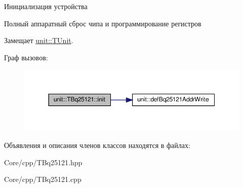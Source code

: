Инициализация устройства 



 Полный аппаратный сброс чипа и программирование регистров 

Замещает \hyperlink{classunit_1_1_t_unit_afc001dd57ba88e571e6b650a416b76a5}{unit\+::\+T\+Unit}.

Граф вызовов\+:\nopagebreak
\begin{figure}[H]
\begin{center}
\leavevmode
\includegraphics[width=350pt]{classunit_1_1_t_bq25121_a195490b2493631c50f5f7380436c24be_cgraph}
\end{center}
\end{figure}


Объявления и описания членов классов находятся в файлах\+:\begin{DoxyCompactItemize}
\item 
Core/cpp/T\+Bq25121.\+hpp\item 
Core/cpp/T\+Bq25121.\+cpp\end{DoxyCompactItemize}
